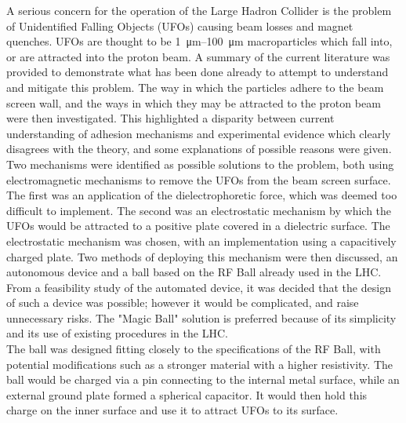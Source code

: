 \documentclass[../main.tex]{subfiles}
\begin{document}
A serious concern for the operation of the Large Hadron Collider is the problem of Unidentified Falling Objects (UFOs) causing beam losses and magnet quenches. 
UFOs are thought to be \SIrange{1}{100}{\micro\metre} macroparticles which fall into, or are attracted into the proton beam.
A summary of the current literature was provided to demonstrate what has been done already to attempt to understand and mitigate this problem.
The way in which the particles adhere to the beam screen wall, and the ways in which they may be attracted to the proton beam were then investigated.
This highlighted a disparity between current understanding of adhesion mechanisms and experimental evidence which clearly disagrees with the theory, and some explanations of possible reasons were given.\\

Two mechanisms were identified as possible solutions to the problem, both using electromagnetic mechanisms to remove the UFOs from the beam screen surface.
The first was an application of the dielectrophoretic force, which was deemed too difficult to implement.
The second was an electrostatic mechanism by which the UFOs would be attracted to a positive plate covered in a dielectric surface.
The electrostatic mechanism was chosen, with an implementation using a capacitively charged plate.
Two methods of deploying this mechanism were then discussed, an autonomous device and a ball based on the RF Ball already used in the LHC.
From a feasibility study of the automated device, it was decided that the design of such a device was possible; however it would be complicated, and raise unnecessary risks.
The "Magic Ball" solution is preferred because of its simplicity and its use of existing procedures in the LHC.\\

The ball was designed fitting closely to the specifications of the RF Ball, with potential modifications such as a stronger material with a higher resistivity.
The ball would be charged via a pin connecting to the internal metal surface, while an external ground plate formed a spherical capacitor.
It would then hold this charge on the inner surface and use it to attract UFOs to its surface.
\end{document}

